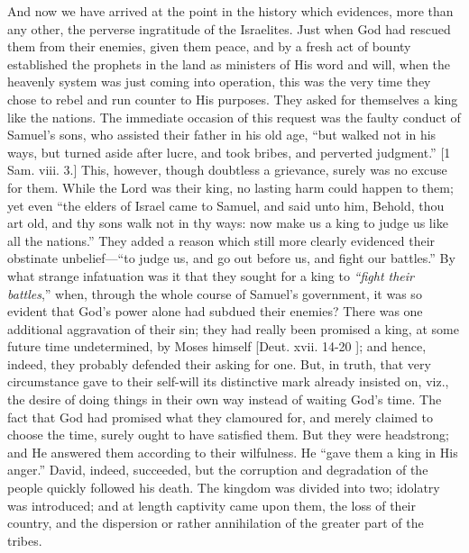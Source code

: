 And now we have arrived at the point in the history which
evidences, more than any other, the perverse ingratitude of the
Israelites. Just when God had rescued them from their enemies, given
them peace, and by a fresh act of bounty established the prophets in
the land as ministers of His word and will, when the heavenly system
was just coming into operation, this was the very time they chose to
rebel and run counter to His purposes. They asked for themselves a
king like the nations. The immediate occasion of this request was the
faulty conduct of Samuel's sons, who assisted their father in his
old age, ``but walked not in his ways, but turned aside after
lucre, and took bribes, and perverted judgment.'' [1 Sam. viii.
3.] This, however, though doubtless a grievance, surely was no excuse
for them. While the Lord was their king, no lasting harm could happen
to them; yet even ``the elders of Israel came to Samuel, and said
unto him, Behold, thou art old, and thy sons walk not in thy ways: now
make us a king to judge us like all the nations.'' They added a
reason which still more clearly evidenced their obstinate unbelief—``to
judge us, and go out before us, and fight our battles.'' By what
strange infatuation was it that they sought for a king to \emph{``fight
their battles},'' when, through the whole course of Samuel's
government, it was so evident that God's power alone had subdued
their enemies? There was one additional aggravation of their sin; they
had really been promised a king, at some future time undetermined, by
Moses himself [Deut. xvii. 14-20 ]; and hence, indeed, they
probably defended their asking for one. But, in truth, that very
circumstance gave to their self-will its distinctive mark already
insisted on, viz., the desire of doing things in their own way instead
of waiting God's time. The fact that God had promised what they
clamoured for, and merely claimed to choose the time, surely ought to
have satisfied them. But they were headstrong; and He answered them
according to their wilfulness. He ``gave them a king in His
anger.'' David, indeed, succeeded, but the corruption and
degradation of the people quickly followed his death. The kingdom was
divided into two; idolatry was introduced; and at length captivity
came upon them, the loss of their country, and the dispersion or
rather annihilation of the greater part of the tribes.


